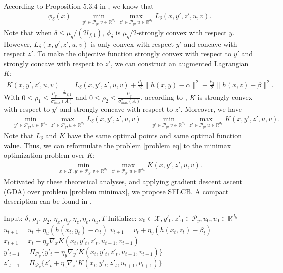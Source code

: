 \documentclass{article}
\newcommand{\Pc}{\mathcal{P}}
\newcommand{\Xc}{\mathcal{X}}
\def\R{\mathbb{R}}
\theoremstyle{plain}
\theoremstyle{definition}
\theoremstyle{remark}
\begin{document}
According to Proposition 5.3.4 in \cite{bertsekas2009convex}, we know that
\begin{align*}
    \phi_\delta(x)=\min_{y'\in \Pc_y, v\in\R^{d_h}}\max_{z'\in \Pc_y, u\in\R^{d_h}}L_\delta(x,y',z',u,v).
\end{align*}
Note that when $\delta\leq \mu_g/(2l_{f,1})$, $\phi_\delta$ is $\mu_g/2$-strongly convex with respect $y$. However, $L_\delta(x,y',z',u,v)$ is only convex with respect $y'$ and concave with respect $z'$.
To make the objective function strongly convex with respect to $y'$ and strongly concave with respect to $z'$, we can construct an augmented Lagrangian $K$: 
\begin{align}\nonumber
    K(x,y',z',u,v)=&L_\delta(x,y',z',u,v)+\frac{\rho_1}{2}\|h(x,y)-\alpha\|^2-\frac{\rho_2}{2}\|h(x,z)-\beta\|^2.
\end{align}
With $0\leq \rho_1\leq \frac{\mu_g-\delta l_{f,1}}{\sigma_{\max}^2(A)}$ and $0\leq \rho_2\leq \frac{\mu_g}{\sigma_{\max}^2(A)}$, according to , $K$ is strongly convex with respect to $y'$ and strongly concave with respect to $z'$.
Moreover, we have
\begin{align*}
    &\min_{y'\in \Pc_y, v\in\R^{d_h}}\max_{z'\in \Pc_y, u\in\R^{d_h}}L_\delta(x,y',z',u,v)=\min_{y'\in \Pc_y, v\in\R^{d_h}}\max_{z'\in \Pc_y, u\in\R^{d_h}} K(x,y',z',u,v).
\end{align*}
Note that $L_\delta$ and $K$ have the same optimal points and same optimal function value. Thus, we can reformulate the problem \eqref{problem eq} to the minimax optimization problem over $K$:
\begin{align}\label{problem minimax}
       \min_{x\in \Xc, y'\in \Pc_y, v\in\R^{d_h}}\max_{z'\in \Pc_y, u\in\R^{d_h}} K(x,y',z',u,v).
\end{align}
Motivated by these theoretical analyses, and applying gradient descent ascent (GDA) over problem \eqref{problem minimax}, we propose SFLCB. A compact description can be found in .

\begin{algorithm}
    \caption{SFLCB}
    \label{alg1}
    \begin{algorithmic}
    \State Input: $\delta$, $\rho_1$, $\rho_2$,  $\eta_x,\eta_y,\eta_z, \eta_v, \eta_u, T$
    \State Initialize: $x_0\in \Xc, y'_0,z'_0\in\Pc_y ,u_0,v_0\in \R^{d_h}$
        \State $u_{t+1}=u_t+\eta_u(h(x_t,y_t)-\alpha_t)$
        \State $v_{t+1}=v_t+\eta_v(h(x_t,z_t)-\beta_t)$
        \State $x_{t+1}=x_t-\eta_x\nabla_x K(x_t,y'_t,z'_t,u_{t+1}, v_{t+1})$
        \State $y'_{t+1}=\Pi_{\Pc_y}\{y'_t-\eta_y\nabla_y' K(x_t,y'_t,z'_t,u_{t+1}, v_{t+1})\}$
        \State $z'_{t+1}=\Pi_{\Pc_y}\{z'_t+\eta_z\nabla_z' K(x_t,y'_t,z'_t,u_{t+1}, v_{t+1})\}$
  \EndFor
  \end{algorithmic}
\end{algorithm}
\end{document}
